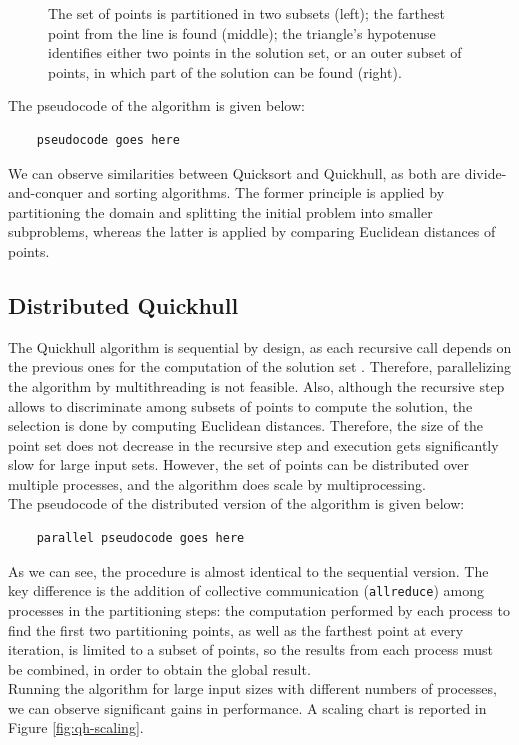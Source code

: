 \documentclass[]{finalproject}
\begin{document}
\begin{figure}[H]
\begin{minipage}{.33\linewidth}
	\end{minipage}
    \caption{The set of points is partitioned in two subsets (left); the farthest point from the line is found (middle); the triangle's hypotenuse identifies either two points in the solution set, or an outer subset of points, in which part of the solution can be found (right).}
    \label{fig:qh-steps}
\end{figure}

The pseudocode of the algorithm is given below:
\begin{verbatim}
    pseudocode goes here
\end{verbatim}

\raggedright We can observe similarities between Quicksort and Quickhull,
as both are divide-and-conquer and sorting algorithms. The former principle is applied by partitioning the domain
and splitting the initial problem into smaller subproblems, whereas the latter is applied by comparing
Euclidean distances of points.


\subsection{Distributed Quickhull}
The Quickhull algorithm is sequential by design,
as each recursive call depends on the previous ones for the computation of the solution set \cite{qhpaper}.
Therefore, parallelizing the algorithm by multithreading is not feasible.
Also, although the recursive step allows to discriminate among subsets of points to compute the solution,
the selection is done by computing Euclidean distances. Therefore, the size of the point set does not decrease
in the recursive step and execution gets significantly slow for large input sets.
However, the set of points can be distributed over multiple processes, and the algorithm does scale by multiprocessing.\\
The pseudocode of the distributed version of the algorithm is given below:
\begin{verbatim}
    parallel pseudocode goes here
\end{verbatim}

\raggedright As we can see, the procedure is almost identical to the sequential version.
The key difference is the addition of collective communication (\verb|allreduce|) among processes in the partitioning steps:
the computation performed by each process to find the first two partitioning points, as well as the farthest point at every iteration,
is limited to a subset of points, so the results from each process must be combined, in order to obtain the global result.\\
Running the algorithm for large input sizes with different numbers of processes, we can observe significant gains in performance.
A scaling chart is reported in Figure \ref{fig:qh-scaling}.
\end{document}
